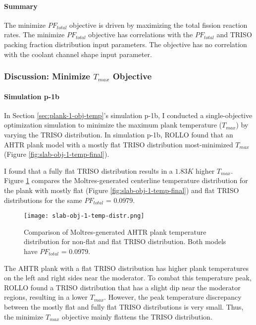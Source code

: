 \paragraph{Summary}
The minimize $PF_{total}$ objective is driven by maximizing the total fission 
reaction rates. 
The minimize $PF_{total}$ objective has correlations with the  
$PF_{total}$ and TRISO packing fraction distribution input parameters. 
The objective has no correlation with the coolant channel shape input parameter. 

\subsubsection{Discussion: Minimize $T_{max}$ Objective}
\paragraph{Simulation p-1b}
In Section \ref{sec:plank-1-obj-temp}'s simulation p-1b, I conducted a single-objective 
optimization simulation to minimize the maximum plank temperature ($T_{max}$) by varying 
the TRISO distribution. 
In simulation p-1b, \gls{ROLLO} found that an \gls{AHTR} plank model with a mostly 
flat TRISO distribution most-minimized $T_{max}$ 
(Figure \ref{fig:slab-obj-1-temp-final}).

I found that a fully flat \gls{TRISO} distribution results in a $1.83 K$ higher $T_{max}$.
Figure \ref{fig:slab-obj-1-temp-distr} compares the Moltres-generated centerline 
temperature distribution for the plank with mostly flat (Figure 
\ref{fig:slab-obj-1-temp-final}) and flat TRISO distributions for the same 
$PF_{total}$ = 0.0979. 
\begin{figure}[htbp!]
    \centering
    \texttt{[image: slab-obj-1-temp-distr.png]}
    \caption{Comparison of Moltres-generated AHTR plank temperature distribution for 
    non-flat and flat TRISO distribution. 
    Both models have $PF_{total}$ = 0.0979.}
    \label{fig:slab-obj-1-temp-distr}
\end{figure}
The \gls{AHTR} plank with a flat \gls{TRISO} distribution has higher plank temperatures 
on the left and right sides near the moderator. 
To combat this temperature peak, ROLLO found a \gls{TRISO} distribution that 
has a slight dip near the moderator regions, resulting in a lower $T_{max}$.
However, the peak temperature discrepancy between the mostly flat and fully flat 
TRISO distributions is very small. 
Thus, the minimize $T_{max}$ objective mainly flattens the TRISO distribution.

